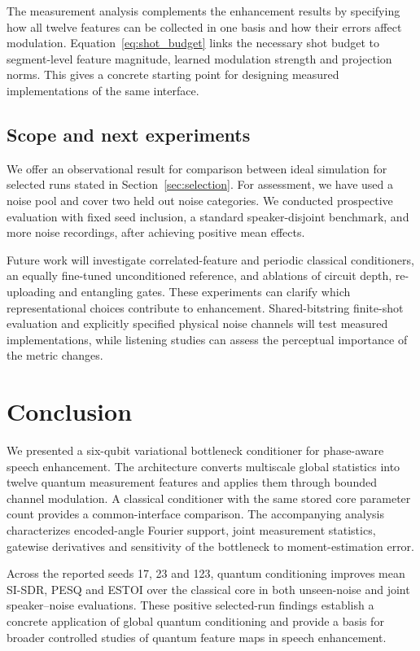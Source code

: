 \documentclass[10pt,a4paper]{article}
\begin{document}
The measurement analysis complements the enhancement results by specifying how all twelve features can be collected in one basis and how their errors affect modulation. Equation~\eqref{eq:shot_budget} links the necessary shot budget to segment-level feature magnitude, learned modulation strength and projection norms. This gives a concrete starting point for designing measured implementations of the same interface.

\subsection{Scope and next experiments}
We offer an observational result for comparison between ideal simulation for selected runs stated in Section~\ref{sec:selection}. For assessment, we have used a noise pool and cover two held out noise categories. We conducted prospective evaluation with fixed seed inclusion, a standard speaker-disjoint benchmark, and more noise recordings, after achieving positive mean effects.

Future work will investigate correlated-feature and periodic classical conditioners, an equally fine-tuned unconditioned reference, and ablations of circuit depth, re-uploading and entangling gates. These experiments can clarify which representational choices contribute to enhancement. Shared-bitstring finite-shot evaluation and explicitly specified physical noise channels will test measured implementations, while listening studies can assess the perceptual importance of the metric changes.

\section{Conclusion}
We presented a six-qubit variational bottleneck conditioner for phase-aware speech enhancement. The architecture converts multiscale global statistics into twelve quantum measurement features and applies them through bounded channel modulation. A classical conditioner with the same stored core parameter count provides a common-interface comparison. The accompanying analysis characterizes encoded-angle Fourier support, joint measurement statistics, gatewise derivatives and sensitivity of the bottleneck to moment-estimation error.

Across the reported seeds 17, 23 and 123, quantum conditioning improves mean SI-SDR, PESQ and ESTOI over the classical core in both unseen-noise and joint speaker--noise evaluations. These positive selected-run findings establish a concrete application of global quantum conditioning and provide a basis for broader controlled studies of quantum feature maps in speech enhancement.
\end{document}
